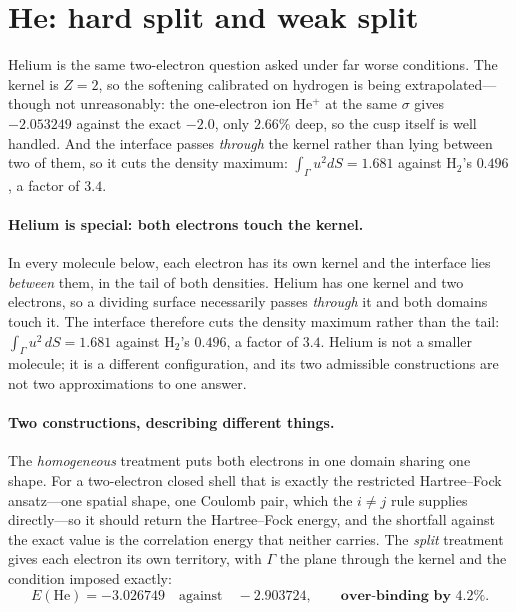 \documentclass[11pt,a4paper]{article}
\begin{document}
\section{He: hard split and weak split}

Helium is the same two-electron question asked under far worse conditions. The kernel is $Z = 2$,
so the softening calibrated on hydrogen is being extrapolated---though not unreasonably: the
one-electron ion He$^+$ at the same $\sigma$ gives $-2.053249$ against the exact $-2.0$, only
$2.66\%$ deep, so the cusp itself is well handled. And the interface passes \emph{through} the
kernel rather than lying between two of them, so it cuts the density maximum:
$\int_\Gamma u^2 dS = 1.681$ against H$_2$'s $0.496$, a factor of $3.4$.

\paragraph{Helium is special: both electrons touch the kernel.} In every molecule below, each
electron has its own kernel and the interface lies \emph{between} them, in the tail of both
densities. Helium has one kernel and two electrons, so a dividing surface necessarily passes
\emph{through} it and both domains touch it. The interface therefore cuts the density maximum
rather than the tail: $\int_\Gamma u^2\,dS = 1.681$ against H$_2$'s $0.496$, a factor of $3.4$.
Helium is not a smaller molecule; it is a different configuration, and its two admissible
constructions are not two approximations to one answer.

\paragraph{Two constructions, describing different things.} The \emph{homogeneous} treatment puts
both electrons in one domain sharing one shape. For a two-electron closed shell that is exactly the
restricted Hartree--Fock ansatz---one spatial shape, one Coulomb pair, which the $i \neq j$ rule
supplies directly---so it should return the Hartree--Fock energy, and the shortfall against the
exact value is the correlation energy that neither carries. The \emph{split} treatment gives each
electron its own territory, with $\Gamma$ the plane through the kernel and the condition imposed
exactly:
\[
  E(\mathrm{He}) = -3.026749 \quad\text{against}\quad -2.903724 ,
  \qquad \textbf{over-binding by } 4.2\% .
\]
\end{document}
